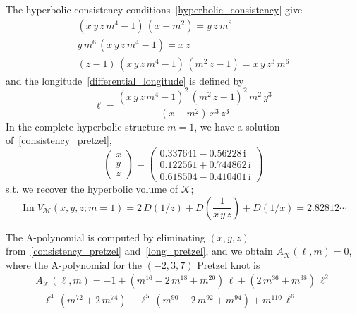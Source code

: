 \documentclass[12pt,reqno]{amsart}
\numberwithin{equation}{section}
\renewcommand{\Im}{\operatorname{Im}}
\newcommand{\I}{\mathrm{i}}
\begin{document}
The hyperbolic consistency
conditions~\eqref{hyperbolic_consistency} give
\begin{equation}
  \label{consistency_pretzel}
  \begin{gathered}
    \left( x \, y \, z \, m^4 - 1 \right) \, \left( x- m^2 \right)
    = y \, z \, m^8
    \\[2mm]
    y \, m^6 \, \left( x \, y \, z \, m^4 - 1 \right)
    = x \, z
    \\[2mm]
    (z-1) \, \left(
      x \, y \, z \, m^4 - 1 \right) \, \left( m^2 \, z -1 \right)
    =
    x \, y \, z^3 \, m^6
  \end{gathered}
\end{equation}
and the longitude~\eqref{differential_longitude} is defined by
\begin{equation}
  \label{long_pretzel}
  \ell
  =
  \frac{
    \left( x \, y \, z \, m^4 -1 \right)^2 \,
    \left( m^2 \, z - 1 \right)^2 \, m^2 \, y^3
  }{
    \left( x - m^2 \right) \, x^3 \, z^3}
\end{equation}
In the complete hyperbolic structure $m=1$,
we have a solution of~\eqref{consistency_pretzel},
\begin{equation*}
  \begin{pmatrix}
    x \\ y \\ z
  \end{pmatrix}
  =
  \begin{pmatrix}
    0.337641 - 0.56228 \, \I \\
    0.122561 + 0.744862 \, \I \\
    0.618504 - 0.410401 \, \I
  \end{pmatrix}
\end{equation*}
s.t.
we recover the hyperbolic volume of $\mathcal{K}$;
\begin{equation*}
  \Im V_\mathcal{M}(x,y,z; m=1)
  =
  2 \, D(1/z) + D\left(\frac{1}{x \, y \, z}\right)
  + D(1/x)
  =
  2.82812 \cdots
\end{equation*}

The A-polynomial is computed by eliminating
$(x,y,z)$ from~\eqref{consistency_pretzel} and~\eqref{long_pretzel},
and we obtain 
$A_\mathcal{K}(\ell, m)=0$, where the A-polynomial for the $(-2,3,7)$
Pretzel knot is
\begin{multline}
  A_{\mathcal{K}}(\ell, m)
  =
  -1 +  \left(
    m^{16} - 2 \, m^{18} + m^{20}
  \right) \, \ell
  +
  \left( 2 \, m^{36} + m^{38} \right) \, \ell^2
  \\
  - \ell^4 \, \left(
    m^{72} + 2 \, m^{74}
  \right)
  -\ell^5 \, \left(
    m^{90} - 2 \, m^{92} + m^{94}
  \right)
  + m^{110} \, \ell^6
\end{multline}
\end{document}
